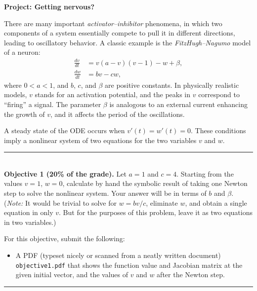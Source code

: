 \documentclass[11pt,letterpaper]{article}
\begin{document}
	
\begin{center}
  \bf 
  Project: Getting nervous?
\end{center}
	
There are many important \textit{activator--inhibitor} phenomena, in which two components of a system essentially compete to pull it in different directions, leading to oscillatory behavior. A classic example is the \emph{FitzHugh--Nagumo} model of a neuron: \begin{equation}
  \label{eq:fh}
  \begin{split}
    \frac{dv}{dt} &= v(a-v)(v-1) - w + \beta, \\
    \frac{dw}{dt} &= b v - c w,
  \end{split}
\end{equation}
where $0<a<1$, and $b$, $c$, and $\beta$ are positive constants. In physically realistic models, $v$ stands for an activation potential, and the peaks in $v$ correspond to ``firing'' a signal. The parameter $\beta$ is analogous to an external current enhancing the growth of $v$, and it affects the period of the oscillations.

A steady state of the ODE occurs when $v'(t)=w'(t)=0$. These conditions imply a nonlinear system of two equations for the two variables $v$ and $w$. 

\hfill \rule{4in}{1pt} \hspace*{\fill}\\

\noindent \textbf{Objective 1 (20\% of the grade).} Let $a=1$ and $c=4$. Starting from the values $v=1$, $w=0$, calculate by hand the symbolic result of taking one Newton step to solve the nonlinear system. Your answer will be in terms of $b$ and $\beta$. (\emph{Note:} It would be trivial to solve for $w=bv/c$, eliminate $w$, and obtain a single equation in only $v$. But for the purposes of this problem, leave it as two equations in two variables.)

For this objective, submit the following:
\begin{itemize}
\item A PDF (typeset nicely or scanned from a neatly written document)
  \texttt{objective1.pdf} 
  that shows the function value and Jacobian matrix at the given
  initial vector, and the values of $v$ and $w$ after the Newton step. 
\end{itemize}

\hfill \rule{4in}{1pt} \hspace*{\fill}\\
\end{document}

